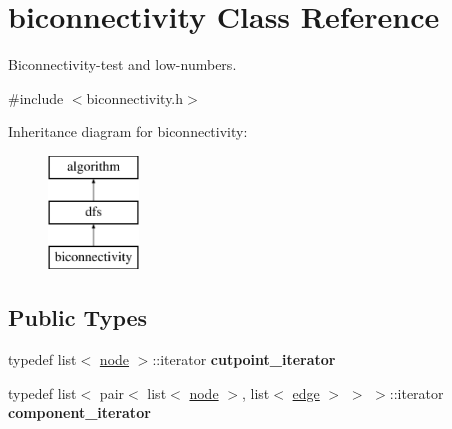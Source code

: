 \hypertarget{classbiconnectivity}{}\section{biconnectivity Class Reference}
\label{classbiconnectivity}


Biconnectivity-\/test and low-\/numbers.  




{\ttfamily \#include $<$biconnectivity.\+h$>$}

Inheritance diagram for biconnectivity\+:\begin{figure}[H]
\begin{center}
\leavevmode
\includegraphics[height=3.000000cm]{classbiconnectivity}
\end{center}
\end{figure}
\subsection*{Public Types}
\begin{DoxyCompactItemize}
\item 
\mbox{\label{classbiconnectivity_ad3823f78779cb1f2d4cf2117667f5ce7}} 
typedef list$<$ \mbox{\hyperlink{classnode}{node}} $>$\+::iterator {\bfseries cutpoint\+\_\+iterator}
\item 
\mbox{\label{classbiconnectivity_acf09990ddb220487655b4f57ccc5226f}} 
typedef list$<$ pair$<$ list$<$ \mbox{\hyperlink{classnode}{node}} $>$, list$<$ \mbox{\hyperlink{classedge}{edge}} $>$ $>$ $>$\+::iterator {\bfseries component\+\_\+iterator}
\end{DoxyCompactItemize}
